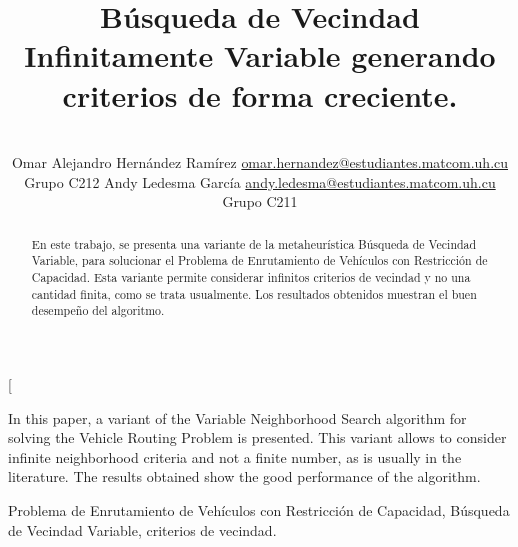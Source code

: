 \documentclass[a4paper,10pt,twocolumn]{article}
\title{Búsqueda de Vecindad Infinitamente Variable generando criterios de forma creciente.}
\author{\\
\name Omar Alejandro Hernández Ramírez \email \href{mailto:omar.hernandez@estudiantes.matcom.uh.cu}{omar.hernandez@estudiantes.matcom.uh.cu}
	\\ \addr Grupo C212 \AND
\name Andy Ledesma García \email \href{mailto:andy.ledesma@estudiantes.matcom.uh.cu}
{andy.ledesma@estudiantes.matcom.uh.cu}
  \\ \addr Grupo C211}
\begin{document}
\twocolumn[

\maketitle


\begin{abstract}

  En este trabajo, se presenta una variante de la metaheurística Búsqueda de Vecindad
  Variable, para solucionar el Problema de Enrutamiento de Vehículos con Restricción 
  de Capacidad. Esta variante permite considerar infinitos criterios de vecindad y no 
  una cantidad finita, como se trata usualmente. Los resultados obtenidos muestran el
  buen desempeño del algoritmo.\\

\end{abstract}

\vspace{0.5cm}

\begin{enabstract}

  In this paper, a variant of the Variable Neighborhood Search algorithm for solving
  the Vehicle Routing Problem is presented. This variant allows to consider infinite
  neighborhood criteria and not a finite number, as is usually in the literature. The results
  obtained show the good performance of the algorithm.\\

\end{enabstract}

\begin{keywords}
	Problema de Enrutamiento de Vehículos con Restricción de Capacidad, Búsqueda de
	Vecindad Variable, criterios de vecindad.
\end{keywords}
\end{document}
